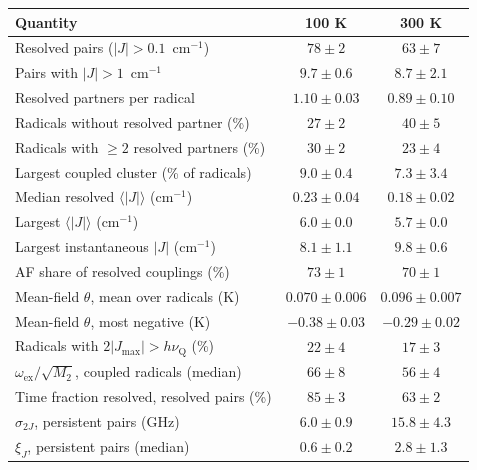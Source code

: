 \begin{tabular}{lcc}
\toprule
Quantity & 100 K & 300 K\\
\midrule
Resolved pairs ($|J|>0.1$~cm$^{-1}$) & $78\pm2$ & $63\pm7$\\
Pairs with $|J|>1$~cm$^{-1}$ & $9.7\pm0.6$ & $8.7\pm2.1$\\
Resolved partners per radical & $1.10\pm0.03$ & $0.89\pm0.10$\\
Radicals without resolved partner (\%) & $27\pm2$ & $40\pm5$\\
Radicals with $\geq2$ resolved partners (\%) & $30\pm2$ & $23\pm4$\\
Largest coupled cluster (\% of radicals) & $9.0\pm0.4$ & $7.3\pm3.4$\\
Median resolved $\langle|J|\rangle$ (cm$^{-1}$) & $0.23\pm0.04$ & $0.18\pm0.02$\\
Largest $\langle|J|\rangle$ (cm$^{-1}$) & $6.0\pm0.0$ & $5.7\pm0.0$\\
Largest instantaneous $|J|$ (cm$^{-1}$) & $8.1\pm1.1$ & $9.8\pm0.6$\\
AF share of resolved couplings (\%) & $73\pm1$ & $70\pm1$\\
Mean-field $\theta$, mean over radicals (K) & $0.070\pm0.006$ & $0.096\pm0.007$\\
Mean-field $\theta$, most negative (K) & $-0.38\pm0.03$ & $-0.29\pm0.02$\\
Radicals with $2|J_\mathrm{max}|>h\nu_\mathrm{Q}$ (\%) & $22\pm4$ & $17\pm3$\\
$\omega_\mathrm{ex}/\sqrt{M_2}$, coupled radicals (median) & $66\pm8$ & $56\pm4$\\
Time fraction resolved, resolved pairs (\%) & $85\pm3$ & $63\pm2$\\
$\sigma_{2J}$, persistent pairs (GHz) & $6.0\pm0.9$ & $15.8\pm4.3$\\
$\xi_J$, persistent pairs (median) & $0.6\pm0.2$ & $2.8\pm1.3$\\
\bottomrule
\end{tabular}
